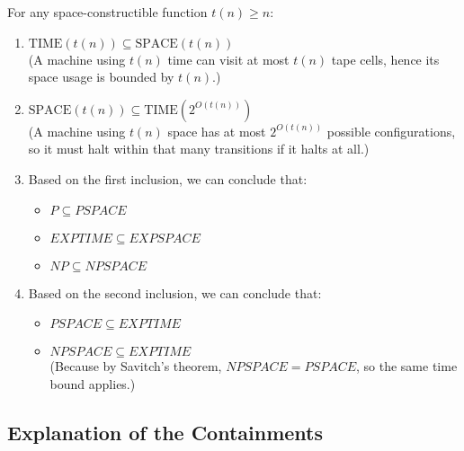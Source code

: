 \begin{theorem}
    For any space-constructible function $t(n) \geq n$:
    \begin{enumerate}
        \item $\text{TIME}(t(n)) \subseteq \text{SPACE}(t(n))$ \\
        (A machine using $t(n)$ time can visit at most $t(n)$ tape cells, hence its space usage is bounded by $t(n)$.)
        
        \item $\text{SPACE}(t(n)) \subseteq \text{TIME}(2^{O(t(n))})$ \\
        (A machine using $t(n)$ space has at most $2^{O(t(n))}$ possible configurations, so it must halt within that many transitions if it halts at all.)
    
        \item Based on the first inclusion, we can conclude that:
        \begin{itemize}
            \item $P \subseteq PSPACE$
            \item $EXPTIME \subseteq EXPSPACE$
            \item $NP \subseteq NPSPACE$
        \end{itemize}
    
        \item Based on the second inclusion, we can conclude that:
        \begin{itemize}
            \item $PSPACE \subseteq EXPTIME$
            \item $NPSPACE \subseteq EXPTIME$ \\
            (Because by Savitch’s theorem, $NPSPACE = PSPACE$, so the same time bound applies.)
        \end{itemize}
    \end{enumerate}    
\end{theorem}

\subsection{Explanation of the Containments}

